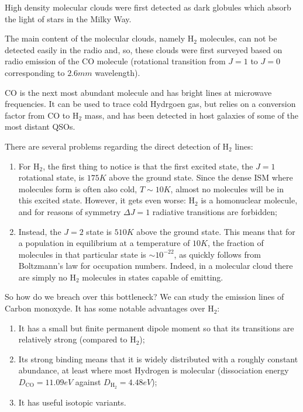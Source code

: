 High density molecular clouds were first detected as dark globules which absorb the light of stars in the Milky Way.
\par The main content of the molecular clouds, namely $\text{H}_{2}$ molecules, can not be detected easily in the radio and, so, these clouds were first surveyed based on radio emission of the CO molecule (rotational transition from $J=1$ to $J=0$ corresponding to $2.6\unit{mm}$ wavelength).
\par CO is the next most abundant molecule and has bright lines at microwave frequencies. It can be used to trace cold Hydrgoen gas, but relies on a conversion factor from CO to $\text{H}_{2}$ mass, and has been detected in host galaxies of some of the most distant QSOs.
\par There are several problems regarding the direct detection of $\text{H}_{2}$ lines:
\begin{enumerate}
    \item For $\text{H}_{2}$, the first thing to notice is that the first excited state, the $J = 1$ rotational state, is $175\unit{K}$ above the ground state. Since the dense ISM where molecules form is often also cold, $T\sim 10\unit{K}$, almost no molecules will be in this excited state. However, it gets even worse: $\text{H}_{2}$ is a homonuclear molecule, and for reasons of symmetry $\Delta J = 1$ radiative transitions are forbidden;
    \item Instead, the $J=2$ state is $510\unit{K}$ above the ground state. This means that for a population in equilibrium at a temperature of $10\unit{K}$, the fraction of molecules in that particular state is $\sim 10^{-22}$, as quickly follows from Boltzmann's law for occupation numbers. Indeed, in a molecular cloud there are simply no $\text{H}_{2}$ molecules in states capable of emitting.
\end{enumerate}
\par So how do we breach over this bottleneck? We can study the emission lines of Carbon monoxyde. It has some notable advantages over $\text{H}_{2}$:
\begin{enumerate}
    \item It has a small but finite permanent dipole moment so that its transitions are relatively strong (compared to $\text{H}_{2}$);
    \item Its strong binding means that it is widely distributed with a roughly constant abundance, at least where most Hydrogen is molecular (dissociation energy $D_{\text{CO}} = 11.09\unit{eV}$ against $D_{\text{H}_{2}}=4.48\unit{eV}$);
    \item It has useful isotopic variants.
\end{enumerate}
